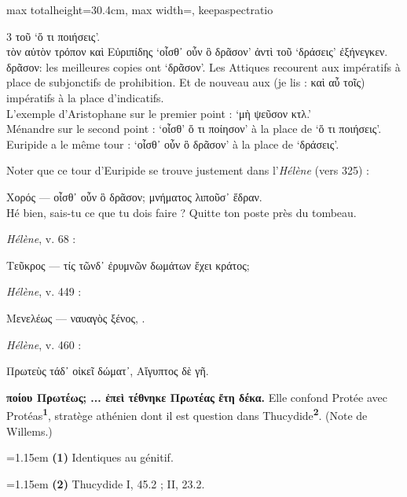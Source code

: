 \documentclass[11pt,twoside]{book}
\newcommand{\italique}[1]{\textit{#1}}
\newcommand{\citComm}[1]{\begin{quoting}[vskip=0.4pt,leftmargin=0.7em,rightmargin=0.2em]#1\end{quoting}}
\newcommand{\francais}[1]{{\policeFr #1}}
\newcommand{\difference}[1]{\dotuline{#1}}
\newcommand{\marqueur}[1]{\textsuperscript{\color{rubricRed}\textbf{#1}}}
\begin{document}
\begin{adjustbox}{max totalheight=30.4cm, max width=\textwidth, keepaspectratio}
\begin{minipage}{\textwidth}
{\begin{multicols}{3}
{τοῦ `ὅ τι ποιήσεις'.\\
τὸν αὐτὸν τρόπον καὶ Εὐριπίδης `οἶσθ᾿ οὖν ὃ δρᾶσον' ἀντὶ τοῦ `δράσεις' ἐξήνεγκεν.\\
δρᾶσον: les meilleures copies ont `δρᾶσον'.
Les Attiques recourent aux impératifs à place de subjonctifs de prohibition. Et de nouveau aux (je lis : καὶ αὖ τοῖς) impératifs à la place d'indicatifs.\\
L'exemple d'Aristophane sur le premier point : `μὴ ψεῦσον κτλ.'\\
Ménandre sur le second point : `οἶσθ' ὅ τι ποίησον' à la place de `ὅ τι ποιήσεις'.\\
Euripide a le même tour : `οἶσθ᾿ οὖν ὃ δρᾶσον' à la place de `δράσεις'.}
\par\vspace{1.5pt}
\noindent Noter que ce tour d'Euripide se trouve justement dans l'\italique{Hélène} (vers 325) :
\citComm{Χορός --- οἶσθ᾽ οὖν ὃ δρᾶσον; μνήματος λιποῦσ᾽ ἕδραν.\\
\francais{Hé bien, sais-tu ce que tu dois faire ? Quitte ton poste près du tombeau.}}
\par\vspace{1.5pt}
 \textbf{} \italique{Hélène}, v. 68 :
\citComm{Τεῦκρος --- τίς τῶνδ᾽ ἐρυμνῶν δωμάτων ἔχει κράτος;}
\par\vspace{1.5pt}
\noindent \italique{Hélène}, v. 449 :
\citComm{Μενελέως --- ναυαγὸς \difference{ἥκω} ξένος, \difference{ἀσύλητον γένος}.}
\par\vspace{1.5pt}
 \textbf{} \italique{Hélène}, v. 460 :
\citComm{Πρωτεὺς τάδ᾽ οἰκεῖ δώματ᾽, Αἴγυπτος δὲ γῆ.}
\par\vspace{1.5pt}
 \textbf{ποίου Πρωτέως; ... ἐπεὶ τέθνηκε Πρωτέας ἔτη δέκα.} Elle confond Protée avec Protéas\marqueur{1}, stratège athénien dont il est question dans Thucydide\marqueur{2}. (Note de Willems.)
\par\vspace{1.5pt}
\par\vspace{1.2pt}\par\nopagebreak\vspace{1pt}\noindent\hangindent=1.15em {\color{sepiaNote}\textbf{(1)}} Identiques au génitif.
\par\vspace{1.5pt}
\noindent\hangindent=1.15em {\color{sepiaNote}\textbf{(2)}} Thucydide I, 45.2 ; II, 23.2.
\par\end{multicols}}
\end{minipage}\end{adjustbox}
\end{document}
